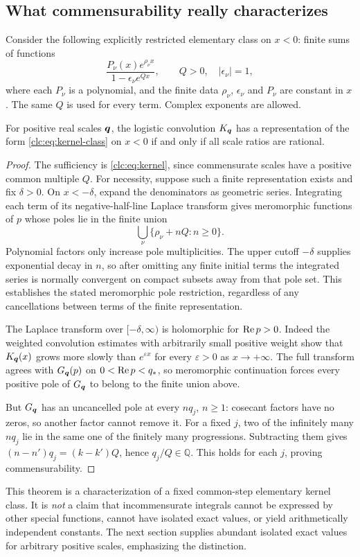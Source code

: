 \subsection{What commensurability really characterizes}
Consider the following explicitly restricted elementary class on $x<0$:
finite sums of functions
\begin{equation}\label{clc:eq:kernel-class}
 \frac{P_\nu(x)e^{\rho_\nu x}}
             {1-\epsilon_\nu e^{Qx}},
 \qquad Q>0,\quad |\epsilon_\nu|=1,
\end{equation}
where each $P_\nu$ is a polynomial, and the finite data $\rho_\nu$,
$\epsilon_\nu$ and $P_\nu$ are constant in $x$. The same $Q$ is used
for every term. Complex exponents are allowed.

\begin{theorem}\label{clc:thm:commensurate}
For positive real scales $\boldsymbol q$, the logistic convolution $K_{\boldsymbol q}$
has a representation of the form \eqref{clc:eq:kernel-class} on $x<0$
if and only if all scale ratios are rational.
\end{theorem}
\begin{proof}
The sufficiency is \eqref{clc:eq:kernel}, since commensurate scales have
a positive common multiple $Q$.
For necessity, suppose such a finite representation exists and fix
$\delta>0$. On $x< -\delta$, expand the denominators as geometric
series. Integrating each term of its negative-half-line Laplace
transform gives meromorphic functions of $p$ whose poles lie in the
finite union
\[
 \bigcup_\nu\{\rho_\nu+nQ:n\ge0\}.
\]
Polynomial factors only increase pole multiplicities. The upper cutoff
$-\delta$ supplies exponential decay in $n$, so after omitting any
finite initial terms the integrated series is normally convergent on
compact subsets away from that pole set. This establishes the stated
meromorphic pole restriction, regardless of any cancellations between
terms of the finite representation.

The Laplace transform over $[-\delta,\infty)$ is holomorphic for
$\operatorname{Re} p>0$. Indeed the weighted convolution estimates with arbitrarily
small positive weight show that $K_{\boldsymbol q}(x)$ grows more slowly than
$e^{\varepsilon x}$ for every $\varepsilon>0$ as $x\to+\infty$.
The full transform agrees with $G_{\boldsymbol q}(p)$ on $0<\operatorname{Re} p<q_*$,
so meromorphic continuation forces every positive pole of $G_{\boldsymbol q}$
to belong to the finite union above.

But $G_{\boldsymbol q}$ has an uncancelled pole at every $nq_j$, $n\ge1$:
cosecant factors have no zeros, so another factor cannot remove it.
For a fixed $j$, two of the infinitely many $nq_j$ lie in the same
one of the finitely many progressions. Subtracting them gives
$(n-n')q_j=(k-k')Q$, hence $q_j/Q\in\mathbb Q$.
This holds for each $j$, proving commensurability.
\end{proof}

This theorem is a characterization of a fixed common-step elementary
kernel class. It is \emph{not} a claim that incommensurate integrals
cannot be expressed by other special functions, cannot have isolated
exact values, or yield arithmetically independent constants.
The next section supplies abundant isolated exact values for arbitrary
positive scales, emphasizing the distinction.

